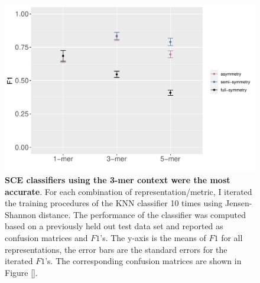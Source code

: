 \begin{figure}[h!]
    \includegraphics[scale=0.75]{graphics/f1_sce.pdf}
    \caption{\textbf{SCE classifiers using the 3-mer context  were the most accurate}. For each combination of representation/metric, I iterated the training procedures of the KNN classifier 10 times using Jensen-Shannon distance. The performance of the classifier was computed based on a previously held out test data set and reported as confusion matrices and $F1$'s. The y-axis is the means of $F1$ for all representations, the error bars are the standard errors for the iterated $F1$’s. The corresponding confusion matrices are shown in Figure \ref{}.}
    \label{fig:f1_sce}
\end{figure}
